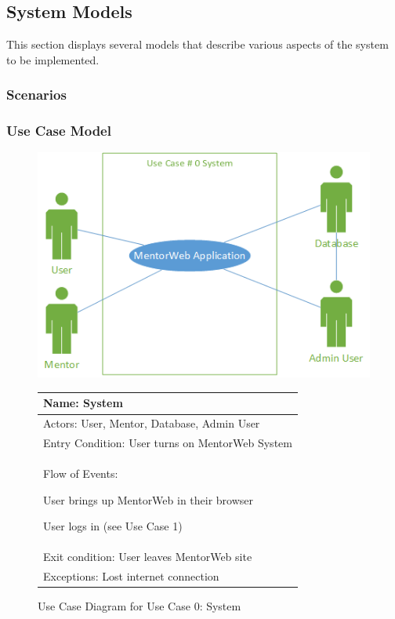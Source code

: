 \documentclass[11pt]{article}
\begin{document}
    \subsection{System Models}
        This section displays several models that describe various aspects of
        the system to be implemented.
        \subsubsection{Scenarios}

        \subsubsection{Use Case Model}
            \begin{figure}[H]
				\centering
				\includegraphics{UseCase0System}

				\begin{tabular}{|p{12 cm}|}
					\hline
					Name: System \\ \hline
					Actors: User, Mentor, Database, Admin User \\ \hline
					Entry Condition: User turns on MentorWeb System \\ \hline
					Flow of Events:
					\begin{enumerate*}
						\item User brings up MentorWeb in their browser
						\item User logs in (see Use Case 1)
					\end{enumerate*} \\ \hline
					Exit condition: User leaves MentorWeb site \\ \hline
					Exceptions: Lost internet connection \\ \hline
				\end{tabular}

				\caption{Use Case Diagram for Use Case 0: System}
				\label{UC0}
            \end{figure}
\end{document}
